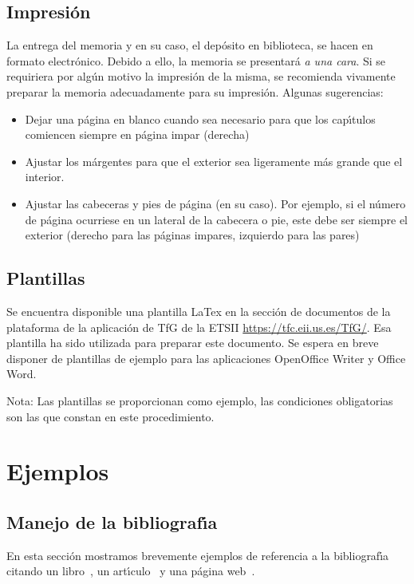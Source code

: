 \section{Impresión}\label{sec:impresion} 
La entrega del memoria y en su caso, el dep\'osito en biblioteca, se hacen en formato electr\'onico. Debido a ello, la memoria se presentará \emph{a una cara}. Si se requiriera
por alg\'un motivo la impresi\'on de la misma, se recomienda vivamente preparar la memoria adecuadamente para su impresi\'on. Algunas sugerencias:
\begin{itemize}
 \item Dejar una p\'agina en blanco cuando sea necesario para que los cap{\'\i}tulos comiencen siempre en p\'agina impar (derecha)
 \item Ajustar los m\'argentes para que el exterior sea ligeramente m\'as grande que el interior.
 \item Ajustar las cabeceras y pies de p\'agina (en su caso). Por ejemplo, si el n\'umero de p\'agina ocurriese en un lateral
 de la cabecera o pie, este debe ser siempre el exterior (derecho para las p\'aginas impares, izquierdo para las pares)
\end{itemize}

\section{Plantillas}\label{sec:plantillas} 

Se encuentra disponible una plantilla LaTex en la secci\'on de documentos de la plataforma
de la aplicaci\'on de TfG de la ETSII 
\url{https://tfc.eii.us.es/TfG/}. Esa plantilla ha sido utilizada para preparar este documento.
Se espera en breve disponer de plantillas de ejemplo para las aplicaciones OpenOffice Writer y Office Word.

Nota: Las plantillas se proporcionan como ejemplo, las condiciones obligatorias son las que constan en este procedimiento.

\chapter{Ejemplos}\label{cap2} 
					
\section{Manejo de la bibliograf{\'\i}a}
En esta secci\'on mostramos brevemente ejemplos de referencia a la bibliograf{\'\i}a 
citando un libro~\cite{desousa}, un art{\'\i}culo~\cite{guiatitlesec} 
y una p\'agina web~\cite{informatica}. 

